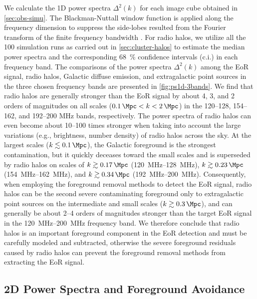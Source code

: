 \documentclass[modern]{aastex62}
\begin{document}
{\color{cyan}%
We calculate the 1D power spectra $\Delta^2(k)$ for each
image cube obtained in \autoref{sec:obs-simu}.
The Blackman-Nuttall window function is applied along the frequency
dimension to suppress the side-lobes resulted from the Fourier transform
of the finite frequency bandwidth \citep[e.g.,][]{trott2015,chapman2016}.
For radio halos, we utilize all the 100 simulation runs as carried out
in \autoref{sec:cluster-halos} to estimate the median power spectra and
the corresponding \SI{68}{\percent} confidence intervals (c.i.) in each
frequency band.
The comparisons of the power spectra $\Delta^2(k)$ among the EoR signal,
radio halos, Galactic diffuse emission, and extragalactic point sources
in the three chosen frequency bands are presented in
\autoref{fig:ps1d-3bands}.
We find that radio halos are generally stronger than the EoR signal by
about 4, 3, and 2 orders of magnitudes on all scales
($\SI{0.1}{\per\Mpc} < k < \SI{2}{\per\Mpc}$) in the \numrange{120}{128},
\numrange{154}{162}, and \numrange{192}{200} \si{\MHz} bands, respectively.
The power spectra of radio halos can even become about \numrange{10}{100}
times stronger when taking into account the large variations (e.g.,
brightness, number density) of radio halos across the sky.
At the largest scales ($k \lesssim \SI{0.1}{\per\Mpc}$), the Galactic
foreground is the strongest contamination, but it quickly deceases
toward the small scales and is superseded by radio halos on scales of
$k \gtrsim \SI{0.17}{\per\Mpc}$ (\SIrange{120}{128}{\MHz}),
$k \gtrsim \SI{0.23}{\per\Mpc}$ (\SIrange{154}{162}{\MHz}), and
$k \gtrsim \SI{0.34}{\per\Mpc}$ (\SIrange{192}{200}{\MHz}).
Consequently, when employing the foreground removal methods to detect
the EoR signal, radio halos can be the second severe contaminating
foreground only to extragalactic point sources on the intermediate and
small scales ($k \gtrsim \SI{0.3}{\per\Mpc}$), and can generally be
about \numrange{2}{4} orders of magnitudes stronger than the target
EoR signal in the \SIrange{120}{200}{\MHz} frequency band.
We therefore conclude that radio halos is an important foreground
component in the EoR detection and must be carefully modeled and
subtracted, otherwise the severe foreground residuals caused by radio
halos can prevent the foreground removal methods from extracting the
EoR signal.
} %

\subsection{2D Power Spectra and Foreground Avoidance}
\label{sec:ps2d}
\end{document}
